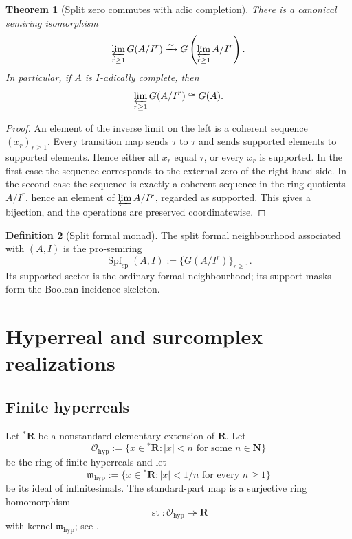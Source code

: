 \documentclass[11pt]{amsart}
\numberwithin{equation}{section}
\newtheorem{theorem}{Theorem}[section]
\theoremstyle{definition}
\newtheorem{definition}[theorem]{Definition}
\newcommand{\R}{\mathbf R}
\newcommand{\N}{\mathbf N}
\newcommand{\st}{\operatorname{st}}
\newcommand{\cO}{\mathcal O}
\begin{document}
\begin{theorem}[Split zero commutes with adic completion]\label{thm:completion-commutes}
There is a canonical semiring isomorphism
\[
\varprojlim_{r\ge1}G(A/I^r)
\xrightarrow{\sim}
G\left(\varprojlim_{r\ge1}A/I^r\right).
\]
In particular, if $A$ is $I$-adically complete, then
\[
\varprojlim_{r\ge1}G(A/I^r)
\cong
G(A).
\]
\end{theorem}

\begin{proof}
An element of the inverse limit on the left is a coherent sequence $(x_r)_{r\ge1}$.  Every transition map sends $\tau$ to $\tau$ and sends supported elements to supported elements.  Hence either all $x_r$ equal $\tau$, or every $x_r$ is supported.  In the first case the sequence corresponds to the external zero of the right-hand side.  In the second case the sequence is exactly a coherent sequence in the ring quotients $A/I^r$, hence an element of $\varprojlim A/I^r$, regarded as supported.  This gives a bijection, and the operations are preserved coordinatewise.
\end{proof}

\begin{definition}[Split formal monad]
The split formal neighbourhood associated with $(A,I)$ is the pro-semiring
\[
\operatorname{Spf}_{\mathrm{sp}}(A,I)
:=
\{G(A/I^r)\}_{r\ge1}.
\]
Its supported sector is the ordinary formal neighbourhood; its support masks form the Boolean incidence skeleton.
\end{definition}

\section{Hyperreal and surcomplex realizations}

\subsection{Finite hyperreals}

Let ${}^{\ast}\R$ be a nonstandard elementary extension of $\R$.  Let
\[
\cO_{\mathrm{hyp}}
:=
\{x\in{}^{\ast}\R:|x|<n\text{ for some }n\in\N\}
\]
be the ring of finite hyperreals and let
\[
\mathfrak m_{\mathrm{hyp}}
:=
\{x\in{}^{\ast}\R:|x|<1/n\text{ for every }n\ge1\}
\]
be its ideal of infinitesimals.  The standard-part map is a surjective ring homomorphism
\[
\st:\cO_{\mathrm{hyp}}\twoheadrightarrow\R
\]
with kernel $\mathfrak m_{\mathrm{hyp}}$; see \cite{Robinson,Goldblatt}.
\end{document}
